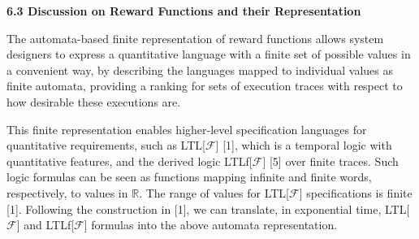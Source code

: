  
 
 
\par\medskip\noindent\textbf{6.3 Discussion on Reward Functions and their Representation}\par
 
 
The automata-based finite representation of reward functions allows system designers to express a quantitative language with a finite set of possible values in a convenient way, by describing the languages mapped to individual values as finite automata, providing a ranking for sets of execution traces with respect to how desirable these executions are.\par
 
 
 
This finite representation enables higher-level specification languages for quantitative requirements, such as LTL[$\mathcal{F}$] [1], which is a temporal logic with quantitative features, and the derived logic LTLf[$\mathcal{F}$] [5] over finite traces. Such logic formulas can be seen as functions mapping infinite and finite words, respectively, to values in $\mathbb{R}$. The range of values for LTL[$\mathcal{F}$] specifications is finite [1]. Following the construction in [1], we can translate, in exponential time, LTL[$\mathcal{F}$] and LTLf[$\mathcal{F}$] formulas into the above automata representation.\par
 
 
 
